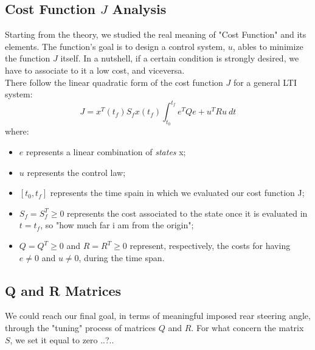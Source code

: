\documentclass[a4paper,12pt,titlepage]{report}
\begin{document}
	\subsection{Cost Function $J$ Analysis}
		Starting from the theory, we studied the real meaning of "Cost Function" and its elements. The function's goal is to design a control system, $u$, ables to minimize the function $J$ itself. In a nutshell, if a certain condition is strongly desired, we have to associate to it a low cost, and viceversa. \\
		There follow the linear quadratic form of the cost function $J$ for a general LTI system:
			\begin{equation}
				J = x^{T}(t_{f}) S_{f} x(t_{f})\int_{t_{0}}^{t_{f}} e^{T} Q e + u^{T} R u \ dt
			\end{equation}
		where:
			\begin{itemize}
				\item $e$ represents a linear combination of \textit{states} x;
				\item $u$ represents the control law;
				\item $ [t_{0},t_{f}] $ represents the time spain in which we evaluated our cost function J;
				\item $ S_{f} = S_{f}^{T} \geq0 $ represents the cost associated to the state once it is evaluated in $t=t_{f}$, so "how much far i am from the origin";
				\item $ Q=Q^{T}\geq 0 $ and $ R=R^{T}\geq 0 $ represent, respectively, the costs for having $e\neq0$ and $u\neq0$, during the time span.
			\end{itemize}
	\subsection{Q and R Matrices}
		We could reach our final goal, in terms of meaningful imposed rear steering angle, through the "tuning" process of matrices $Q$ and $R$. For what concern the matrix $S$, we set it equal to zero ..?..	
\end{document}
